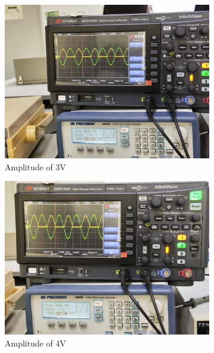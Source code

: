 \begin{itemize}
\begin{figure}[H]
            \begin{subfigure}{0.3\textwidth}
                \centering
                \includegraphics[width=1\linewidth]{Experiment_12/Images/RetA 50-3-min.jpg}
                \caption{Amplitude of 3V}
                \label{l123wf1}
            \end{subfigure}
            \begin{subfigure}{0.3\textwidth}
                \centering
                \includegraphics[width=1\linewidth]{Experiment_12/Images/RetA 50-4-min.jpg}
                \caption{Amplitude of 4V}
                \label{l124wf1}
            \end{subfigure}
            \begin{subfigure}{0.3\textwidth}

\end{subfigure}
\end{figure}
\end{itemize}
